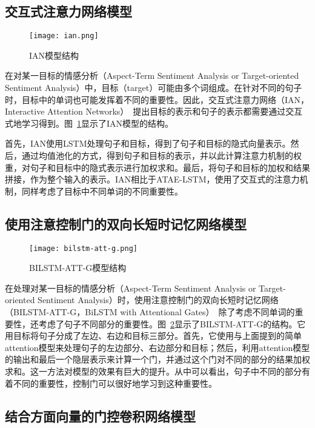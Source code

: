 \subsection{交互式注意力网络模型}

\begin{figure}[ht]
    \centering
    \texttt{[image: ian.png]}
    \caption{IAN模型结构}
    \label{fig:ian}
\end{figure}

在对某一目标的情感分析（Aspect-Term Sentiment Analysis or Target-oriented Sentiment Analysis）中，目标（target）可能由多个词组成。在针对不同的句子时，目标中的单词也可能发挥着不同的重要性。因此，交互式注意力网络（IAN，Interactive Attention Networks）~\cite{ma2017interactive}提出目标的表示和句子的表示都需要通过交互式地学习得到。图~\ref{fig:ian}显示了IAN模型的结构。

首先，IAN使用LSTM处理句子和目标，得到了句子和目标的隐式向量表示。然后，通过均值池化的方式，得到句子和目标的表示，并以此计算注意力机制的权重，对句子和目标中的隐式表示进行加权求和。最后，将句子和目标的加权和结果拼接，作为整个输入的表示。IAN相比于ATAE-LSTM，使用了交互式的注意力机制，同样考虑了目标中不同单词的不同重要性。

\subsection{使用注意控制门的双向长短时记忆网络模型}

\begin{figure}[ht]
    \centering 
    \texttt{[image: bilstm-att-g.png]}
    \caption{BILSTM-ATT-G模型结构}
    \label{fig:bilstm-att-g}
\end{figure}

在处理对某一目标的情感分析（Aspect-Term Sentiment Analysis or Target-oriented Sentiment Analysis）时，使用注意控制门的双向长短时记忆网络（BILSTM-ATT-G，BiLSTM with Attentional Gates）~\cite{liu2017attention}除了考虑不同单词的重要性，还考虑了句子不同部分的重要性。图~\ref{fig:bilstm-att-g}显示了BILSTM-ATT-G的结构。它用目标将句子分成了左边、右边和目标三部分。首先，它使用与上面提到的简单attention模型来处理句子的左边部分、右边部分和目标；然后，利用attention模型的输出和最后一个隐层表示来计算一个门，并通过这个门对不同的部分的结果加权求和。这一方法对模型的效果有巨大的提升。从中可以看出，句子中不同的部分有着不同的重要性，控制门可以很好地学习到这种重要性。

\subsection{结合方面向量的门控卷积网络模型}

